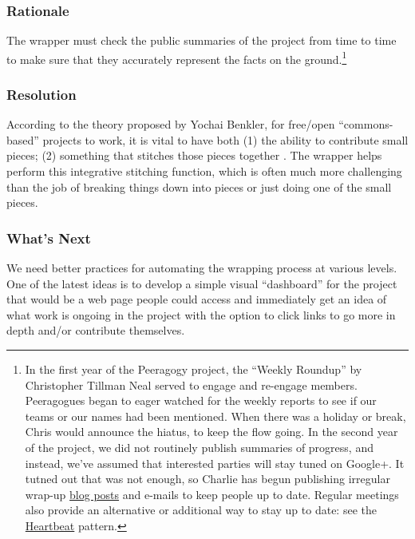 \subsubsection*{Rationale}
The wrapper must check the public summaries of the project from time to time to make sure that they accurately represent the facts on the ground.\footnote{In the first year of the Peeragogy project, the ``Weekly Roundup'' by Christopher Tillman Neal served to engage and re-engage members. Peeragogues began to eager watched for the weekly reports to see if our teams or our names had been mentioned. When there was a holiday or break, Chris would announce the hiatus, to keep the flow going. In the second year of the project, we did not routinely publish summaries of progress, and instead, we've assumed that interested parties will stay tuned on Google+. It tutned out that was not enough, so Charlie has begun publishing irregular wrap-up \href{http://peeragogy.org/peeragogy-wrapper-post-9-feb-5-apr-2015/}{blog posts} and e-mails to keep people up to date. Regular meetings also provide an alternative or additional way to stay up to date: see the \href{http://peeragogy.org/patterns/heartbeat/}{Heartbeat} pattern.}

\subsubsection*{Resolution} 
According to the theory proposed by Yochai Benkler, for free/open ``commons-based'' projects to work, it is vital to have both (1) the ability to contribute small pieces; (2) something that stitches those pieces together \cite{coases-penguin}. The wrapper helps perform this integrative stitching function, which is often much more challenging than the job of breaking things down into pieces or just doing one of the small pieces.

\subsubsection*{What's Next}
We need better practices for automating the wrapping process at various levels. One of the latest ideas is to develop a simple visual ``dashboard'' for the project that would be a web page people could access and immediately get an idea of what work is ongoing in the project with the option to click links to go more in depth and/or contribute themselves.


